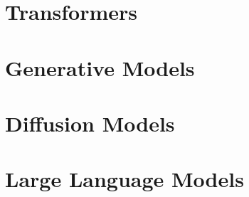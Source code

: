 \documentclass[11pt,fleqn,oneside]{book} %
\begin{document}
\newpage
\chapter{Transformers}


\newpage
\chapter{Generative Models}


\newpage
\chapter{Diffusion Models}


\newpage
\chapter{Large Language Models}


\newpage \ \newpage

\listoffigures



\end{document}
